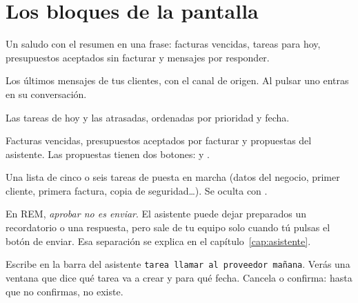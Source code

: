 \section{Los bloques de la pantalla}
\begin{description}[leftmargin=0.6cm,style=nextline]
\item[Cabecera.] Un saludo con el resumen en una frase: facturas vencidas, tareas para hoy, presupuestos aceptados sin facturar y mensajes por responder.
\item[Mensajes por responder.] Los últimos mensajes de tus clientes, con el canal de origen. Al pulsar uno entras en su conversación.
\item[Tareas.] Las tareas de hoy y las atrasadas, ordenadas por prioridad y fecha.
\item[Necesita tu atención.] Facturas vencidas, presupuestos aceptados por facturar y propuestas del asistente. Las propuestas tienen dos botones:  y .
\item[Primeros pasos.] Una lista de cinco o seis tareas de puesta en marcha (datos del negocio, primer cliente, primera factura, copia de seguridad…). Se oculta con .
\end{description}

\begin{ideabox}
En REM, \emph{aprobar no es enviar}. El asistente puede dejar preparados un recordatorio o una respuesta, pero sale de tu equipo solo cuando tú pulsas el botón de enviar. Esa separación se explica en el capítulo~\ref{cap:asistente}.
\end{ideabox}

\begin{checkbox}
Escribe en la barra del asistente \texttt{tarea llamar al proveedor mañana}. Verás una ventana que dice qué tarea va a crear y para qué fecha. Cancela o confirma: hasta que no confirmas, no existe.
\end{checkbox}
